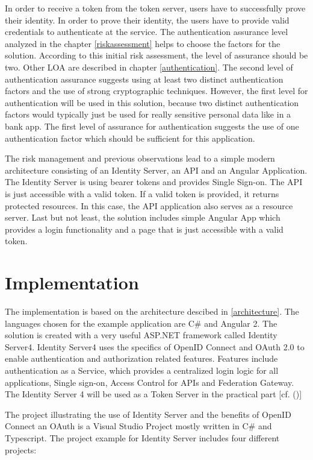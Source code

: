   In order to receive a token from the token server, users have to successfully prove their identity. In order to prove their identity, the users have to provide valid credentials to authenticate at the service. The authentication assurance level analyzed in the chapter \ref{riskassessment} helps to choose the factors for the solution. According to this initial risk assessment, the level of assurance should be two. Other LOA are described in chapter \ref{authentication}. The second level of authentication assurance suggests using at least two distinct authentication factors and the use of strong cryptographic techniques. However, the first level for authentication will be used in this solution, because two distinct authentication factors would typically just be used for really sensitive personal data like in a bank app. The first level of assurance for authentication suggests the use of one authentication factor which should be sufficient for this application.
 
 The risk management and previous observations lead to a simple modern architecture consisting of an Identity Server, an API and an Angular Application. The Identity Server is using bearer tokens and provides Single Sign-on. The API is just accessible with a valid token. If a valid token is provided, it returns protected resources. In this case, the API application also serves as a resource server. Last but not least, the solution includes simple Angular App which provides a login functionality and a page that is just accessible with a valid token.
 

\section{Implementation}

The implementation is based on the architecture descibed in \ref{architecture}. The languages chosen for the example application are C\# and Angular 2. The solution is created with a very useful ASP.NET framework called Identity Server4. Identity Server4 uses the specifics of OpenID Connect and OAuth 2.0 to enable authentication and authorization related features. Features include authentication as a Service, which provides a centralized login logic for all applications, Single sign-on, Access Control for APIs and Federation Gateway. The Identity Server 4 will be used as a Token Server in the practical part [cf. (\cite{Brock:2018:ID4})]

The project illustrating the use of Identity Server and the benefits of OpenID Connect an OAuth is a Visual Studio Project mostly written in C\# and Typescript. The project example for Identity Server includes four different projects:

